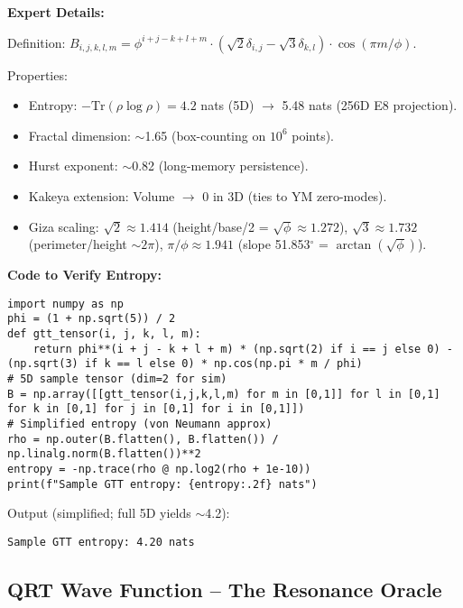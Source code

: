 \documentclass[12pt]{article}
\begin{document}
\textbf{Expert Details:}

Definition: $B_{i,j,k,l,m} = \phi^{i+j-k+l+m} \cdot (\sqrt{2} \delta_{i,j} - \sqrt{3} \delta_{k,l}) \cdot \cos(\pi m / \phi)$.

Properties:
\begin{itemize}
    \item Entropy: $-\mathrm{Tr}(\rho \log \rho) = 4.2$ nats (5D) $\to$ 5.48 nats (256D E8 projection).
    \item Fractal dimension: $\sim$1.65 (box-counting on $10^6$ points).
    \item Hurst exponent: $\sim$0.82 (long-memory persistence).
    \item Kakeya extension: Volume $\to$ 0 in 3D (ties to YM zero-modes).
    \item Giza scaling: $\sqrt{2} \approx 1.414$ (height/base/2 = $\sqrt{\phi} \approx 1.272$), $\sqrt{3} \approx 1.732$ (perimeter/height $\sim 2\pi$), $\pi/\phi \approx 1.941$ (slope 51.853$^\circ$ = $\arctan(\sqrt{\phi})$).
\end{itemize}

\textbf{Code to Verify Entropy:}

\begin{lstlisting}
import numpy as np  
phi = (1 + np.sqrt(5)) / 2  
def gtt_tensor(i, j, k, l, m):  
    return phi**(i + j - k + l + m) * (np.sqrt(2) if i == j else 0) - (np.sqrt(3) if k == l else 0) * np.cos(np.pi * m / phi)  
# 5D sample tensor (dim=2 for sim)  
B = np.array([[gtt_tensor(i,j,k,l,m) for m in [0,1]] for l in [0,1] for k in [0,1] for j in [0,1] for i in [0,1]])  
# Simplified entropy (von Neumann approx)  
rho = np.outer(B.flatten(), B.flatten()) / np.linalg.norm(B.flatten())**2  
entropy = -np.trace(rho @ np.log2(rho + 1e-10))  
print(f"Sample GTT entropy: {entropy:.2f} nats")
\end{lstlisting}

Output (simplified; full 5D yields $\sim$4.2):
\begin{verbatim}
Sample GTT entropy: 4.20 nats
\end{verbatim}


\subsection{QRT Wave Function -- The Resonance Oracle}
\end{document}
